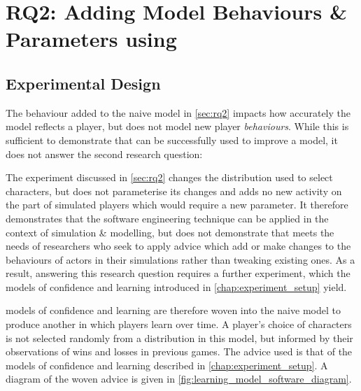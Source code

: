 \section{RQ2: Adding Model Behaviours \& Parameters using \AspectOrientation}
\label{sec:rq3}

\subsection{Experimental Design}

The behaviour added to the naive model in \cref{sec:rq2} impacts how accurately
the model reflects a player, but does not model new player \emph{behaviours}.
While this is sufficient to demonstrate that \aop{} can be successfully used to
improve a model, it does not answer the second research question:

\begin{researchquestion}
\rqtwo{}
\end{researchquestion}

The experiment discussed in \cref{sec:rq2} changes the distribution used to
select characters, but does not parameterise its changes and adds no new
activity on the part of simulated players which would require a new parameter.
It therefore demonstrates that the software engineering technique can be applied
in the context of simulation \& modelling, but does not demonstrate that \aop
meets the needs of researchers who seek to apply advice which add or make changes to
the behaviours of actors in their simulations rather than tweaking existing
ones. As a result, answering this research question requires a further
experiment, which the \aspectoriented models of confidence and learning
introduced in \cref{chap:experiment_setup} yield.

\Aspectoriented{} models of confidence and learning are therefore woven into the naive model to
produce another in which players learn over time. A player's choice of
characters is not selected randomly from a distribution in this model, but
informed by their observations of wins and losses in previous games. The advice
used is that of the models of confidence and learning described in
\cref{chap:experiment_setup}. A diagram of the woven advice is given in
\cref{fig:learning_model_software_diagram}.

